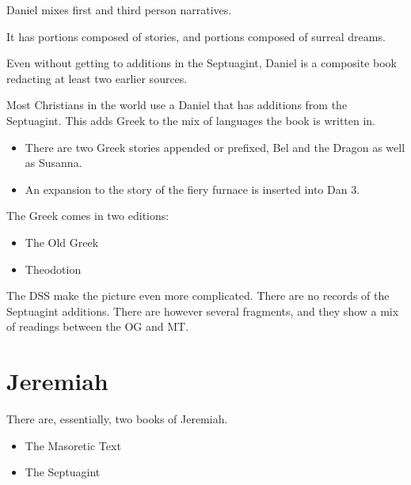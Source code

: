 \documentclass{beamer}
\begin{document}
\begin{frame}
  Daniel mixes first and third person narratives.
\end{frame}

\begin{frame}
  It has portions composed of stories, and portions composed of surreal dreams.
\end{frame}

\begin{frame}
  Even without getting to additions in the Septuagint, Daniel is a composite book redacting at least two earlier sources.
\end{frame}

\begin{frame}
  Most Christians in the world use a Daniel that has additions from the Septuagint.
  This adds Greek to the mix of languages the book is written in.\pause
  \begin{itemize}
	\item There are two Greek stories appended or prefixed, Bel and the Dragon as well as Susanna.\pause
	\item An expansion to the story of the fiery furnace is inserted into Dan 3.
  \end{itemize}
\end{frame}

\begin{frame}
  The Greek comes in two editions:\pause
  \begin{itemize}
	\item The Old Greek\pause
	\item Theodotion
  \end{itemize}
\end{frame}

\begin{frame}
  The DSS make the picture even more complicated.
  There are no records of the Septuagint additions.
  There are however several fragments, and they show a mix of readings between the OG and MT.
\end{frame}

\section{Jeremiah}

\begin{frame}
  There are, essentially, two books of Jeremiah.\pause
  \begin{itemize}
	\item The Masoretic Text\pause
	\item The Septuagint
  \end{itemize}
\end{frame}
\end{document}
